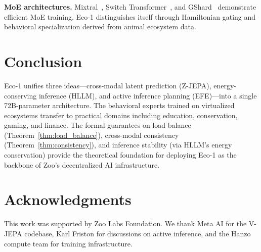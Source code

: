 \documentclass[11pt,letterpaper]{article}
\begin{document}
\textbf{MoE architectures.} Mixtral~\cite{jiang2024mixtral}, Switch Transformer~\cite{fedus2022switch}, and GShard~\cite{lepikhin2021gshard} demonstrate efficient MoE training. Eco-1 distinguishes itself through Hamiltonian gating and behavioral specialization derived from animal ecosystem data.

\section{Conclusion}

Eco-1 unifies three ideas---cross-modal latent prediction (Z-JEPA), energy-conserving inference (HLLM), and active inference planning (EFE)---into a single 72B-parameter architecture. The behavioral experts trained on virtualized ecosystems transfer to practical domains including education, conservation, gaming, and finance. The formal guarantees on load balance (Theorem~\ref{thm:load_balance}), cross-modal consistency (Theorem~\ref{thm:consistency}), and inference stability (via HLLM's energy conservation) provide the theoretical foundation for deploying Eco-1 as the backbone of Zoo's decentralized AI infrastructure.

\section*{Acknowledgments}

This work was supported by Zoo Labs Foundation. We thank Meta AI for the V-JEPA codebase, Karl Friston for discussions on active inference, and the Hanzo compute team for training infrastructure.
\end{document}
